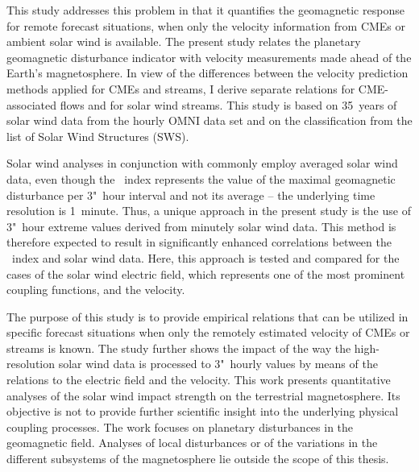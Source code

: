 This study addresses this problem in that it quantifies the geomagnetic response for remote forecast situations, when only the velocity information from CMEs or ambient solar wind is available.
The present study relates the planetary geomagnetic disturbance indicator \Kp{} with velocity measurements made ahead of the Earth's magnetosphere. In view of the differences between the velocity prediction methods applied for CMEs and streams, I derive separate relations for CME-associated flows and for solar wind streams. This study is based on 35~years of solar wind data from the hourly OMNI data set and on the classification from the list of Solar Wind Structures (SWS).

Solar wind analyses in conjunction with \Kp{} commonly employ averaged solar wind data, even though the \Kp~index represents the value of the maximal geomagnetic disturbance per 3"~hour interval and not its average -- the underlying time resolution is 1~minute. Thus, a unique approach in the present study is the use of 3"~hour extreme values derived from minutely solar wind data. This method is therefore expected to result in significantly enhanced correlations between the \Kp~index and solar wind data. Here, this approach is tested and compared for the cases of the solar wind electric field, which represents one of the most prominent coupling functions, and the velocity.

The purpose of this study is to provide empirical \Kp{} relations that can be utilized in specific forecast situations when only the remotely estimated velocity of CMEs or streams is known.
The study further shows the impact of the way the high-resolution solar wind data is processed to 3"~hourly values by means of the \Kp{} relations to the electric field and the velocity.
This work presents quantitative analyses of the solar wind impact strength on the terrestrial magnetosphere. Its objective is not to provide further scientific insight into the underlying physical coupling processes.
The work focuses on planetary disturbances in the geomagnetic field. Analyses of local disturbances or of the variations in the different subsystems of the magnetosphere lie outside the scope of this thesis.

\bigskip

